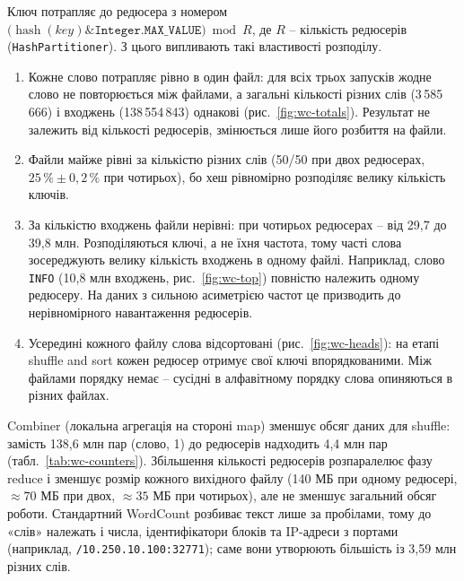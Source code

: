\documentclass{iasa-lab}
\begin{document}
Ключ потрапляє до редюсера з номером $\bigl(\operatorname{hash}(\mathit{key}) \mathbin{\&} \texttt{Integer.MAX\_VALUE}\bigr) \bmod R$, де $R$ -- кількість редюсерів (\texttt{HashPartitioner}). З цього випливають такі властивості розподілу.
\begin{enumerate}
  \item Кожне слово потрапляє рівно в один файл: для всіх трьох запусків жодне слово не повторюється між файлами, а загальні кількості різних слів (3\,585\,666) і входжень (138\,554\,843) однакові (рис.~\ref{fig:wc-totals}). Результат не залежить від кількості редюсерів, змінюється лише його розбиття на файли.
  \item Файли майже рівні за кількістю різних слів (50/50 при двох редюсерах, $25\,\% \pm 0{,}2\,\%$ при чотирьох), бо хеш рівномірно розподіляє велику кількість ключів.
  \item За кількістю входжень файли нерівні: при чотирьох редюсерах -- від 29,7 до 39,8 млн. Розподіляються ключі, а не їхня частота, тому часті слова зосереджують велику кількість входжень в одному файлі. Наприклад, слово \texttt{INFO} (10,8 млн входжень, рис.~\ref{fig:wc-top}) повністю належить одному редюсеру. На даних з сильною асиметрією частот це призводить до нерівномірного навантаження редюсерів.
  \item Усередині кожного файлу слова відсортовані (рис.~\ref{fig:wc-heads}): на етапі shuffle and sort кожен редюсер отримує свої ключі впорядкованими. Між файлами порядку немає -- сусідні в алфавітному порядку слова опиняються в різних файлах.
\end{enumerate}




Combiner (локальна агрегація на стороні map) зменшує обсяг даних для shuffle: замість 138,6 млн пар (слово, 1) до редюсерів надходить 4,4 млн пар (табл.~\ref{tab:wc-counters}). Збільшення кількості редюсерів розпаралелює фазу reduce і зменшує розмір кожного вихідного файлу (140 МБ при одному редюсері, $\approx 70$ МБ при двох, $\approx 35$ МБ при чотирьох), але не зменшує загальний обсяг роботи. Стандартний WordCount розбиває текст лише за пробілами, тому до «слів» належать і числа, ідентифікатори блоків та IP-адреси з портами (наприклад, \texttt{/10.250.10.100:32771}); саме вони утворюють більшість із 3,59 млн різних слів.
\end{document}
